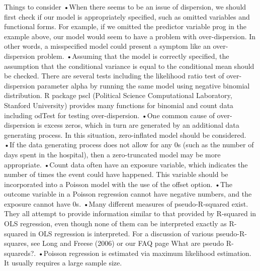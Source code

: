 

Things to consider
 •When there seems to be an issue of dispersion, we should first check if our model is appropriately specified, such as omitted variables and functional forms. For example, if we omitted the predictor variable prog in the example above, our model would seem to have a problem with over-dispersion. In other words, a misspecified model could present a symptom like an over-dispersion problem. 
•Assuming that the model is correctly specified, the assumption that the conditional variance is equal to the conditional mean should be checked. There are several tests including the likelihood ratio test of over-dispersion parameter alpha by running the same model using negative binomial distribution. R package pscl (Political Science Computational Laboratory, Stanford University) provides many functions for binomial and count data including odTest for testing over-dispersion. 
•One common cause of over-dispersion is excess zeros, which in turn are generated by an additional data generating process. In this situation, zero-inflated model should be considered.
•If the data generating process does not allow for any 0s (such as the number of days spent in the hospital), then a zero-truncated model may be more appropriate.
•Count data often have an exposure variable, which indicates the number of times the event could have happened. This variable should be incorporated into a Poisson model with the use of the offset option.
•The outcome variable in a Poisson regression cannot have negative numbers, and the exposure cannot have 0s.
•Many different measures of pseudo-R-squared exist. They all attempt to provide information similar to that provided by R-squared in OLS regression, even though none of them can be interpreted exactly as R-squared in OLS regression is interpreted. For a discussion of various pseudo-R-squares, see Long and Freese (2006) or our FAQ page What are pseudo R-squareds?.
•Poisson regression is estimated via maximum likelihood estimation. It usually requires a large sample size. 




